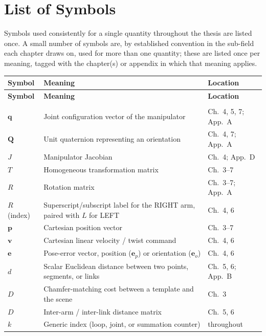 \cleardoublepage
\chapter*{List of Symbols}
\makeatletter
{}
\makeatother

Symbols used consistently for a single quantity throughout the thesis are listed once. A small
number of symbols are, by established convention in the sub-field each chapter draws on, used for
more than one quantity; these are listed once per meaning, tagged with the chapter(s) or appendix in
which that meaning applies.

\begin{xltabular}{\textwidth}{@{}l X l@{}}
\toprule
\textbf{Symbol} & \textbf{Meaning} & \textbf{Location} \\
\midrule
\endfirsthead
\toprule
\textbf{Symbol} & \textbf{Meaning} & \textbf{Location} \\
\midrule
\endhead
\bottomrule
\endfoot
{} \\
\midrule
$\mathbf{q}$ & Joint configuration vector of the manipulator & Ch.~4, 5, 7; App.~A \\
$\mathbf{Q}$ & Unit quaternion representing an orientation & Ch.~4, 7; App.~A \\
$J$ & Manipulator Jacobian & Ch.~4; App.~D \\
$T$ & Homogeneous transformation matrix & Ch.~3--7 \\
$R$ & Rotation matrix & Ch.~3--7; App.~A \\
$R$ (index) & Superscript/subscript label for the RIGHT arm, paired with $L$ for LEFT & Ch.~4, 6 \\
$\mathbf{p}$ & Cartesian position vector & Ch.~3--7 \\
$\mathbf{v}$ & Cartesian linear velocity / twist command & Ch.~4, 6 \\
$\mathbf{e}$ & Pose-error vector, position ($\mathbf{e}_p$) or orientation ($\mathbf{e}_o$) & Ch.~4, 6 \\
$d$ & Scalar Euclidean distance between two points, segments, or links & Ch.~5, 6; App.~B \\
$D$ & Chamfer-matching cost between a template and the scene & Ch.~3 \\
$D$ & Inter-arm / inter-link distance matrix & Ch.~5, 6 \\
$k$ & Generic index (loop, joint, or summation counter) & throughout \\

\end{xltabular}
